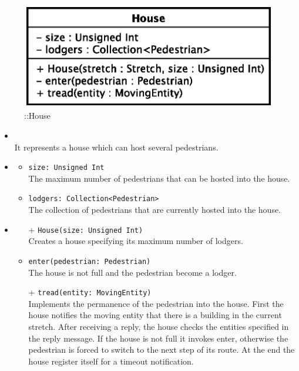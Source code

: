 \begin{figure}[h]
\centering
\includegraphics[scale=0.6,keepaspectratio]{images/solution/app/backend/house.eps}
\caption{\pReactiveComponentStretchDecoration::House}
\label{fig:sd-app-house}
\end{figure}
\FloatBarrier
\begin{itemize}
  \item \textbf{\descr} \\
    It represents a house which can host several pedestrians.
  \item \textbf{\attrs}
  \begin{itemize}
    \item \texttt{size: Unsigned Int} \\
The maximum number of pedestrians that can be hosted into the house.
    \item \texttt{lodgers: Collection<Pedestrian>} \\
The collection of pedestrians that are currently hosted into the house.
  \end{itemize}
  \item \textbf{\ops}
  \begin{itemize} 
   \item[+] \texttt{House(size: Unsigned Int)} \\
Creates a house specifying its maximum number of lodgers.
    \item \texttt{enter(pedestrian: Pedestrian)} \\
The house is not full and the pedestrian become a lodger.   
\item[+] \texttt{tread(entity: MovingEntity)} \\
Implements the permanence of the pedestrian into the house. First the house notifies the moving entity that there is a building in the current stretch. After receiving a reply, the house checks the entities specified in the reply message. If the house is not full it invokes enter, otherwise the pedestrian is forced to switch to the next step of its route. At the end the house register itself for a timeout notification.
  \end{itemize}
\end{itemize}
